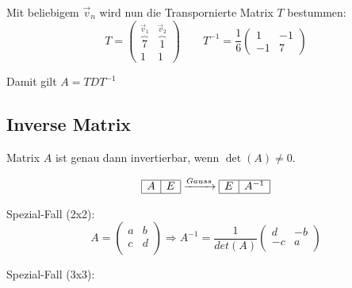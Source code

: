 Mit beliebigem $\vec{v}_n$ wird nun die Transpornierte Matrix $T$ bestummen:
\[
T = \begin{pmatrix}
	\overbrace{7}^{\vec{v}_1} & \overbrace{1}^{\vec{v}_2} \\
	1 & 1
\end{pmatrix} \qquad T^{-1}=\frac{1}{6}\begin{pmatrix}
1 & -1 \\ -1 & 7
\end{pmatrix}
\]

Damit gilt $A = TDT^{-1}$

\subsection{Inverse Matrix}\label{inversematrix}
Matrix $A$ ist genau dann invertierbar, wenn $\det(A) \neq 0$. 

\[
\begin{array}{|c|c|} \hline A & E \\ \hline \end{array} \xrightarrow{Gauss}
\begin{array}{|c|c|} \hline E & A^{-1} \\ \hline \end{array} 
\]

\noindent
Spezial-Fall (2x2):
\[
A = \begin{pmatrix}
	a & b \\
	c & d \\
\end{pmatrix}
\Rightarrow 
A^{-1} =\frac{1}{det(A)}
\begin{pmatrix}
	d & -b \\
	-c & a \\
\end{pmatrix}
\]

\noindent
Spezial-Fall (3x3):

